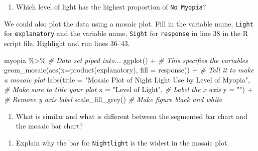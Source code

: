 \documentclass[
]{report}
\newenvironment{Shaded}{\begin{snugshade}}{\end{snugshade}}
\newcommand{\AttributeTok}[1]{\textcolor[rgb]{0.77,0.63,0.00}{#1}}
\newcommand{\CommentTok}[1]{\textcolor[rgb]{0.56,0.35,0.01}{\textit{#1}}}
\newcommand{\FunctionTok}[1]{\textcolor[rgb]{0.00,0.00,0.00}{#1}}
\newcommand{\NormalTok}[1]{#1}
\newcommand{\SpecialCharTok}[1]{\textcolor[rgb]{0.00,0.00,0.00}{#1}}
\newcommand{\StringTok}[1]{\textcolor[rgb]{0.31,0.60,0.02}{#1}}
\providecommand{\tightlist}{%
  \setlength{\itemsep}{0pt}\setlength{\parskip}{0pt}}
\begin{document}
\vspace{0.5in}

\begin{enumerate}
\def\labelenumi{\arabic{enumi}.}
\setcounter{enumi}{7}
\tightlist
\item
  Which level of light has the highest proportion of \texttt{No\ Myopia}?
\end{enumerate}

\vspace{0.5in}

We could also plot the data using a mosaic plot. Fill in the variable name, \texttt{Light} for \texttt{explanatory} and the variable name, \texttt{Sight} for \texttt{response} in line 38 in the R script file. Highlight and run lines 36--43.

\begin{Shaded}
\begin{Highlighting}[]
\NormalTok{myopia }\SpecialCharTok{\%\textgreater{}\%} \CommentTok{\# Data set piped into...}
  \FunctionTok{ggplot}\NormalTok{() }\SpecialCharTok{+}   \CommentTok{\# This specifies the variables}
  \FunctionTok{geom\_mosaic}\NormalTok{(}\FunctionTok{aes}\NormalTok{(}\AttributeTok{x=}\FunctionTok{product}\NormalTok{(explanatory), }\AttributeTok{fill =}\NormalTok{ response)) }\SpecialCharTok{+}  \CommentTok{\# Tell it to make a mosaic plot}
  \FunctionTok{labs}\NormalTok{(}\AttributeTok{title =} \StringTok{"Mosaic Plot of Night Light Use by Level of Myopia"}\NormalTok{,  }
       \CommentTok{\# Make sure to title your plot }
       \AttributeTok{x =} \StringTok{"Level of Light"}\NormalTok{,   }\CommentTok{\# Label the x axis}
       \AttributeTok{y =} \StringTok{""}\NormalTok{) }\SpecialCharTok{+}  \CommentTok{\# Remove y axis label}
      \FunctionTok{scale\_fill\_grey}\NormalTok{()  }\CommentTok{\# Make figure black and white}
\end{Highlighting}
\end{Shaded}

\begin{enumerate}
\def\labelenumi{\arabic{enumi}.}
\setcounter{enumi}{8}
\tightlist
\item
  What is similar and what is different between the segmented bar chart and the mosaic bar chart?
\end{enumerate}

\vspace{1in}

\begin{enumerate}
\def\labelenumi{\arabic{enumi}.}
\setcounter{enumi}{9}
\tightlist
\item
  Explain why the bar for \texttt{Nightlight} is the widest in the mosaic plot.
\end{enumerate}
\end{document}
